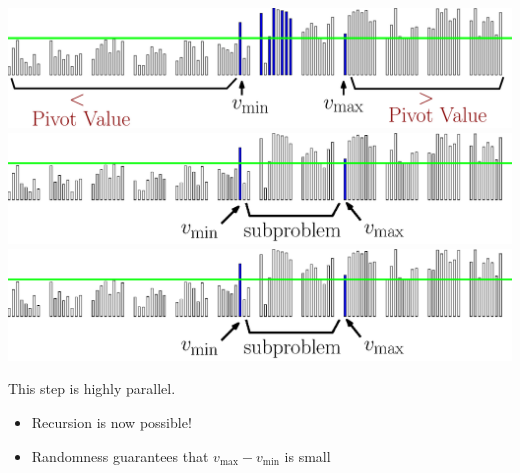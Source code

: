 \documentclass[xcolor=x11names, svgnames, rgb]{beamer}
\begin{document}
\begin{frame}[t]{}
\begin{overprint}
	\includegraphics[width=\linewidth]{imgs/smoothedStridingAlgSim/sim4.eps}
	\onslide<6>\includegraphics[width=\linewidth]{imgs/smoothedStridingAlgSim/sim45.eps}
	\onslide<7>\includegraphics[width=\linewidth]{imgs/smoothedStridingAlgSim/sim45.eps}
	\end{overprint}
	\vspace{0.25cm}
	\begin{overprint}
	This step is highly parallel.
 \begin{itemize} \item Recursion is now possible! \item Randomness guarantees that $v_{\max} - v_{\min}$ is small \end{itemize} 
	\end{overprint}
\end{frame}
\end{document}
